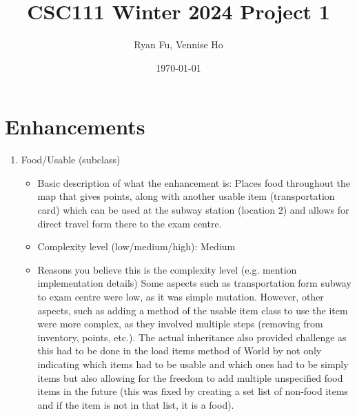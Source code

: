 \documentclass[11pt]{article}
\title{CSC111 Winter 2024 Project 1}
\author{Ryan Fu, Vennise Ho}
\date{\today}
\begin{document}
\maketitle

\section*{Enhancements}


\begin{enumerate}

\item Food/Usable (subclass)
	\begin{itemize}
	\item Basic description of what the enhancement is: Places food throughout the map that gives points, along with another usable item (transportation card)
	which can be used at the subway station (location 2) and allows for direct travel form there to the exam centre.
	\item Complexity level (low/medium/high): Medium
	\item Reasons you believe this is the complexity level (e.g. mention implementation details)
	Some aspects such as transportation form subway to exam centre were low, as it was simple mutation. However, other
	aspects, such as adding a method of the usable item class to use the item were more complex, as they involved
	multiple steps (removing from inventory, points, etc.). The actual inheritance also provided challenge as this
	had to be done in the load items method of World by not only indicating which items had to be usable and which
	ones had to be simply items but also allowing for the freedom to add multiple unspecified food items in the future
	(this was fixed by creating a set list of non-food items and if the item is not in that list, it is a food).
	\end{itemize}



\end{enumerate}
\end{document}
